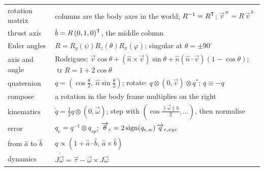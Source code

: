 \begin{result}
\begin{center}\small
\renewcommand{\arraystretch}{1.4}
\begin{tabularx}{\linewidth}{@{}l>{\raggedright\arraybackslash}X@{}}
rotation matrix & columns are the body axes in the world; $R^{-1} = R^{\mathsf{T}}$; $\vec v^{\,w} = R\,\vec v^{\,b}$\\
thrust axis & $\hat b = R\,(0, 1, 0)^{\mathsf{T}}$, the middle column\\
Euler angles & $R = R_y(\psi)R_z(\theta)R_x(\varphi)$; singular at $\theta = \pm90^\circ$\\
axis and angle & Rodrigues: $\vec v\cos\theta + (\hat n \times \vec v)\sin\theta + \hat n(\hat n \cdot \vec v)(1 - \cos\theta)$; $\operatorname{tr}R = 1 + 2\cos\theta$\\
quaternion & $q = (\cos\tfrac\theta2,\ \hat n\sin\tfrac\theta2)$; rotate: $q \otimes (0, \vec v) \otimes q^*$; $q \equiv -q$\\
compose & a rotation in the body frame multiplies on the right\\
kinematics & $\dot q = \tfrac12q \otimes (0, \vec\omega)$; step with $(\cos\tfrac{\|\vec\omega\|h}{2}, \dots)$, then normalise\\
error & $q_e = q^{-1} \otimes q_{sp}$; $\overrightarrow{\theta}_e = 2\operatorname{sign}(q_{e,w})\,\overrightarrow{q}_{e,xyz}$\\
from $\hat a$ to $\hat b$ & $q \propto (1 + \hat a \cdot \hat b,\ \hat a \times \hat b)$\\
dynamics & $J\dot{\vec\omega} = \vec\tau - \vec\omega \times J\vec\omega$\\
\end{tabularx}
\end{center}
\end{result}
